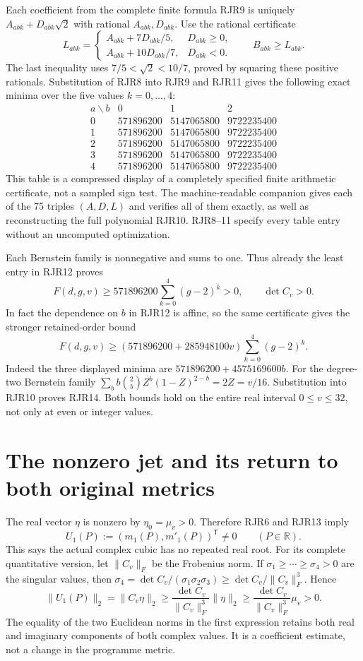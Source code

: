 \documentclass[11pt]{article}
\newcommand{\R}{\mathbb R}
\begin{document}
Each coefficient from the complete finite formula RJR9 is uniquely
$A_{abk}+D_{abk}\sqrt2$ with rational $A_{abk},D_{abk}$.
Use the rational certificate
\[
 L_{abk}=\begin{cases}
 A_{abk}+7D_{abk}/5,&D_{abk}\ge0,\\
 A_{abk}+10D_{abk}/7,&D_{abk}<0.
 \end{cases}\qquad B_{abk}\ge L_{abk}.
 \tag{RJR11}
\]
The last inequality uses $7/5<\sqrt2<10/7$, proved by squaring
these positive rationals. Substitution of RJR8 into RJR9 and RJR11
gives the following exact minima over the five values $k=0,\ldots,4$:
\[
\begin{array}{c|rrr}
 a\backslash b&0&1&2\\\hline
 0&571896200&5147065800&9722235400\\
 1&571896200&5147065800&9722235400\\
 2&571896200&5147065800&9722235400\\
 3&571896200&5147065800&9722235400\\
 4&571896200&5147065800&9722235400
\end{array}\tag{RJR12}
\]
This table is a compressed display of a completely specified finite
arithmetic certificate, not a sampled sign test. The machine-readable
companion gives each of the 75 triples $(A,D,L)$ and verifies all of
them exactly, as well as reconstructing the full polynomial RJR10.
RJR8--11 specify every table entry without an uncomputed optimization.

Each Bernstein family is nonnegative and sums to one. Thus already
the least entry in RJR12 proves
\[
 F(d,g,v)\ge571896200\sum_{k=0}^4(g-2)^k>0,
 \qquad\det C_v>0.
 \tag{RJR13}
\]
In fact the dependence on $b$ in RJR12 is affine, so the same
certificate gives the stronger retained-order bound
\[
 F(d,g,v)\ge(571896200+285948100v)
              \sum_{k=0}^4(g-2)^k.
 \tag{RJR14}
\]
Indeed the three displayed minima are
$571896200+4575169600b$. For the degree-two Bernstein family
$\sum_b b\binom2bZ^b(1-Z)^{2-b}=2Z=v/16$. Substitution into
RJR10 proves RJR14. Both bounds hold on the entire real interval
$0\le v\le32$, not only at even or integer values.

\section{The nonzero jet and its return to both original metrics}
The real vector $\eta$ is nonzero by $\eta_0=\mu_v>0$. Therefore
RJR6 and RJR13 imply
\[
 U_1(P):=(m_1(P),m'_1(P))^{\mathsf T}\ne0
 \qquad(P\in\R).
 \tag{RJR15}
\]
This says the actual complex cubic has no repeated real root.
For its complete quantitative version, let $\|C_v\|_F$ be the
Frobenius norm. If $\sigma_1\ge\cdots\ge\sigma_4>0$ are the
singular values, then
$\sigma_4=\det C_v/(\sigma_1\sigma_2\sigma_3)
\ge\det C_v/\|C_v\|_F^3$. Hence
\[
 \|U_1(P)\|_2=\|C_v\eta\|_2
 \ge\frac{\det C_v}{\|C_v\|_F^3}\|\eta\|_2
 \ge\frac{\det C_v}{\|C_v\|_F^3}\mu_v>0.
 \tag{RJR16}
\]
The equality of the two Euclidean norms in the first expression
retains both real and imaginary components of both complex values.
It is a coefficient estimate, not a change in the programme metric.
\end{document}
